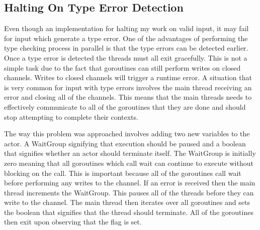 \documentclass{acm_proc_article-sp}
\begin{document}
	\subsection{Halting On Type Error Detection}
		Even though an implementation for halting my work on valid input, it may fail for input which generate a type error. One of the advantages of performing the type checking process in parallel is that the type errors can be detected earlier. Once a type error is detected the threads must all exit gracefully. This is not a simple task due to the fact that goroutines can still perform writes on closed channels. Writes to closed channels will trigger a runtime error. A situation that is very common for input with type errors involves the main thread receiving an error and closing all of the channels. This means that the main threads needs to effectively communicate to all of the goroutines that they are done and should stop attempting to complete their contexts.

		The way this problem was approached involves adding two new variables to the actor. A WaitGroup signifying that execution should be paused and a boolean that signifies whether an actor should terminate itself. The WaitGroup is initially zero meaning that all goroutines which call wait can continue to execute without blocking on the call. This is important because all of the goroutines call wait before performing any writes to the channel. If an error is received then the main thread increments the WaitGroup. This pauses all of the threads before they can write to the channel. The main thread then iterates over all goroutines and sets the boolean that signifies that the thread should terminate. All of the goroutines then exit upon observing that the flag is set.
\end{document}
